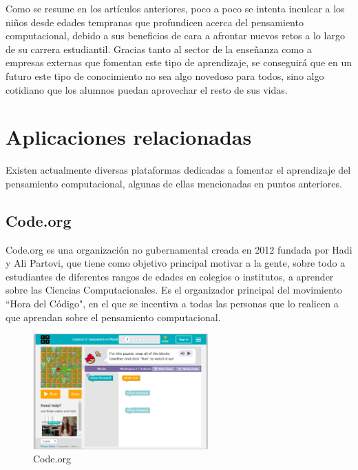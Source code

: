 Como se resume en los artículos anteriores, poco a poco se intenta inculcar a los niños desde edades tempranas que profundicen acerca del pensamiento computacional, debido a sus beneficios de cara a afrontar nuevos retos a lo largo de su carrera estudiantil. 
Gracias tanto al sector de la enseñanza como a empresas externas que fomentan este tipo de aprendizaje, se conseguirá que en un futuro este tipo de conocimiento no sea algo novedoso para todos, sino algo cotidiano que los alumnos puedan aprovechar el resto de sus vidas.


\section{Aplicaciones relacionadas}
\label{2:sec:2}

Existen actualmente diversas plataformas dedicadas a fomentar el aprendizaje del pensamiento computacional, algunas de ellas mencionadas en puntos anteriores.


\subsection{Code.org}
\label{2:sec:1}

Code.org es una organización no gubernamental creada en 2012 fundada por Hadi y Ali Partovi, que tiene como objetivo principal motivar a la gente, sobre todo a estudiantes de diferentes rangos de edades en colegios o institutos, a aprender sobre las Ciencias Computacionales. Es el organizador principal del movimiento ``Hora del Código", en el que se incentiva a todas las personas que lo realicen a que aprendan sobre el
pensamiento computacional.

\begin{figure}[!th]
\begin{center}
\includegraphics[width=0.6\textwidth]{images/captura_code.eps}
\caption{Code.org}
\label{fig:1}
\end{center}
\end{figure}

